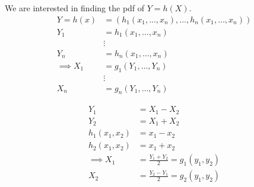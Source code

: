 We are interested in finding the pdf of $Y = h\left( X \right) $. 
\begin{align*}
Y =  	h\left( x \right) &= \left(h_{1}\left( x_{1} , \ldots  , x_{n} \right)  , \ldots , h_{n}\left( x_{1} , \ldots , x_{n} \right) \right)\\
	Y_1 &=  h_{1}\left( x_{1} , \ldots  , x_{n} \right)\\
	    &\vdots\\
	  Y_{n} &= h_{n}\left( x_{1} , \ldots , x_{n} \right) \\
	  \implies X_1 &= g_1 \left( Y_{1} , \ldots , Y_{n} \right)  \\
		       &\vdots \\
		        X_{n} &= g_{n}\left( Y_{1} , \ldots , Y_{n} \right) 
  \end{align*}
  \begin{eg}
	  \begin{align*}
	  	Y_1 &= X_1 - X_2\\
	Y_2 &= X_1 + X_2\\
	h_1\left( x_1, x_2 \right) &= x_1 - x_2 \\
	h_2 \left( x_1, x_2  \right) &= x_1 + x_2  \\
	\implies X_1 &= \frac{Y_1 + Y_2}{2} = g_1\left( y_1, y_2 \right)  \\
	X_2 &= \frac{Y_2 - Y_1}{2} = g_2\left( y_1, y_2 \right) 
	  \end{align*}
  \end{eg}

